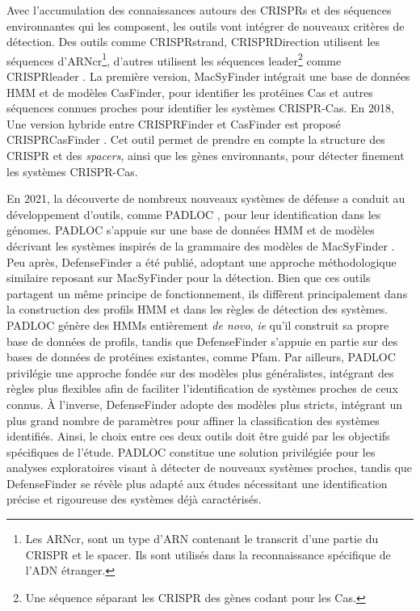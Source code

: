 Avec l'accumulation des connaissances autours des CRISPRs et des séquences environnantes qui les composent, les outils vont intégrer de nouveaux critères de détection. Des outils comme CRISPRstrand\cite{alkhnbashi_crisprstrand_2014}, CRISPRDirection\cite{biswas_accurate_2014} utilisent les séquences d'ARNcr\footnote{Les ARNcr, sont un type d'ARN contenant le transcrit d'une partie du CRISPR et le spacer. Ils sont utilisés dans la reconnaissance spécifique de l'ADN étranger.}, d'autres utilisent les séquences leader\footnote{Une séquence séparant les CRISPR des gènes codant pour les Cas.} comme CRISPRleader \cite{alkhnbashi_characterizing_2016}. La première version, MacSyFinder \cite{abby_macsyfinder_2014} intégrait une base de données HMM et de modèles CasFinder, pour identifier les protéines Cas et autres séquences connues proches pour identifier les systèmes CRISPR-Cas. En 2018, Une version hybride entre CRISPRFinder et CasFinder est proposé CRISPRCasFinder \cite{couvin_crisprcasfinder_2018}. Cet outil permet de prendre en compte la structure des CRISPR et des \textit{spacers}, ainsi que les gènes environnants, pour détecter finement les systèmes CRISPR-Cas.


En 2021, la découverte de nombreux nouveaux systèmes de défense a conduit au développement d’outils, comme PADLOC \cite{payne_identification_2021}, pour leur identification dans les génomes. PADLOC s’appuie sur une base de données HMM et de modèles décrivant les systèmes inspirés de la grammaire des modèles de MacSyFinder \cite{abby_macsyfinder_2014}. Peu après, DefenseFinder \cite{tesson_systematic_2022} a été publié, adoptant une approche méthodologique similaire reposant sur MacSyFinder pour la détection.
Bien que ces outils partagent un même principe de fonctionnement, ils diffèrent principalement dans la construction des profils HMM et dans les règles de détection des systèmes. PADLOC génère des HMMs entièrement \textit{de novo}, \textit{ie} qu'il construit sa propre base de données de profils, tandis que DefenseFinder s’appuie en partie sur des bases de données de protéines existantes, comme Pfam\cite{mistry_pfam_2021}. Par ailleurs, PADLOC privilégie une approche fondée sur des modèles plus généralistes, intégrant des règles plus flexibles afin de faciliter l’identification de systèmes proches de ceux connus. À l’inverse, DefenseFinder adopte des modèles plus stricts, intégrant un plus grand nombre de paramètres pour affiner la classification des systèmes identifiés.
Ainsi, le choix entre ces deux outils doit être guidé par les objectifs spécifiques de l’étude. PADLOC constitue une solution privilégiée pour les analyses exploratoires visant à détecter de nouveaux systèmes proches, tandis que DefenseFinder se révèle plus adapté aux études nécessitant une identification précise et rigoureuse des systèmes déjà caractérisés.
